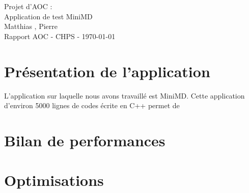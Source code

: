 \documentclass[11pt,a4paper]{article}
\begin{document}
\begin{center}

	{\LARGE\centering Projet d'AOC :\\ Application de test MiniMD}\\[1cm]

	{ Matthias , Pierre }\\[0.5cm]
	{Rapport AOC - CHPS - \today}\\[2cm]
\end{center}

\tableofcontents
\newpage

\section{Présentation de l'application}
	L'application sur laquelle nous avons travaillé est MiniMD. Cette application d'environ 5000 lignes de codes écrite en C++ permet de 
\section{Bilan de performances}

\section{Optimisations}
\end{document}
